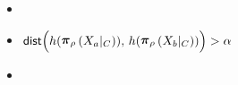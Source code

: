 {\ifnum{}
\vspace{-2em}
\begin{itemize}[leftmargin=1em,itemsep=0pt,label={}]
\item 
\fi
\ifnum{}
\end{itemize}
\vspace{-1.4em}
\begin{itemize}[leftmargin=2.2em,label={  },itemsep=0pt]
\item 
\fi
$\dist\Big(h(\restrict{X_a|_C}{\selection}),\, h(\restrict{X_b|_C}{\selection})\Big) > \alpha$
\ifnum{}
\end{itemize}
\fi
\ifnum{}
\vspace{-2em}
\begin{itemize}[leftmargin=1em,itemsep=0pt,label={}]
\item 
\fi
{}
\ifnum{}
\end{itemize}
\fi
}